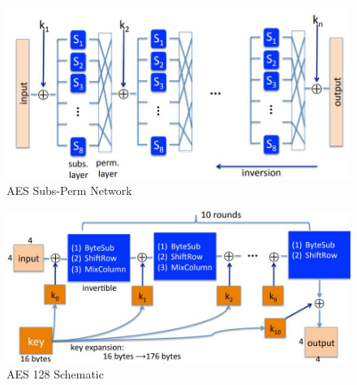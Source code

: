 \begin{figure}[ht]
\centering
\includegraphics[width=\textwidth]{AES_network.jpg}
\caption{AES Subs-Perm Network}\label{aes_network}
\end{figure}
\begin{figure}[ht]
\centering
\includegraphics[width=\textwidth]{aes128.jpg}
\caption{AES 128 Schematic}\label{aes128}
\end{figure}

